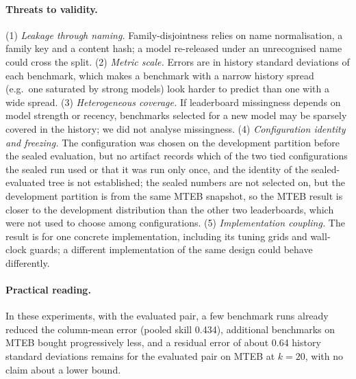 \documentclass{article}
\begin{document}
\paragraph{Threats to validity.} (1) \emph{Leakage through naming.} Family-disjointness relies on name normalisation, a family key and a content hash; a model re-released under an unrecognised name could cross the split. (2) \emph{Metric scale.} Errors are in history standard deviations of each benchmark, which makes a benchmark with a narrow history spread (e.g.\ one saturated by strong models) look harder to predict than one with a wide spread. (3) \emph{Heterogeneous coverage.} If leaderboard missingness depends on model strength or recency, benchmarks selected for a new model may be sparsely covered in the history; we did not analyse missingness. (4) \emph{Configuration identity and freezing.} The configuration was chosen on the development partition before the sealed evaluation, but no artifact records which of the two tied configurations the sealed run used or that it was run only once, and the identity of the sealed-evaluated tree is not established; the sealed numbers are not selected on, but the development partition is from the same MTEB snapshot, so the MTEB result is closer to the development distribution than the other two leaderboards, which were not used to choose among configurations. (5) \emph{Implementation coupling.} The result is for one concrete implementation, including its tuning grids and wall-clock guards; a different implementation of the same design could behave differently.

\paragraph{Practical reading.} In these experiments, with the evaluated pair, a few benchmark runs already reduced the column-mean error (pooled skill 0.434), additional benchmarks on MTEB bought progressively less, and a residual error of about 0.64 history standard deviations remains for the evaluated pair on MTEB at $k{=}20$, with no claim about a lower bound.
\end{document}
